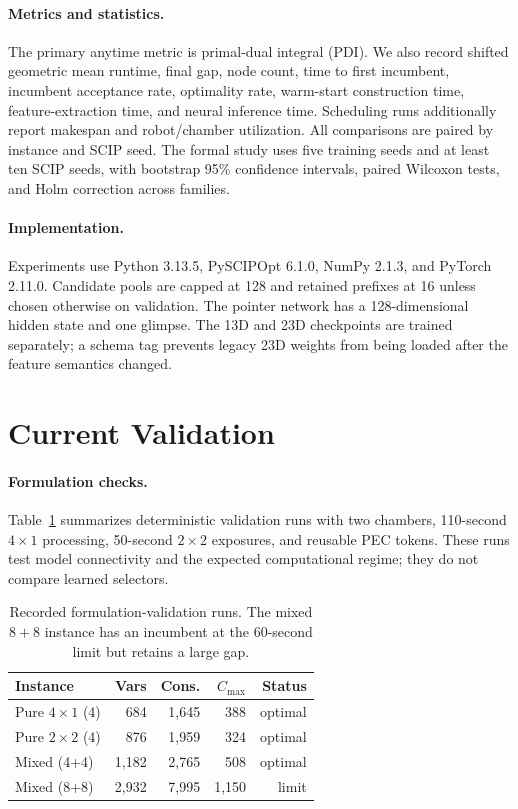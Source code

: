\documentclass[letterpaper]{article}
\begin{document}
\paragraph{Metrics and statistics.}
The primary anytime metric is primal-dual integral (PDI).
We also record shifted geometric mean runtime, final gap, node count, time to first incumbent, incumbent acceptance rate, optimality rate, warm-start construction time, feature-extraction time, and neural inference time.
Scheduling runs additionally report makespan and robot/chamber utilization.
All comparisons are paired by instance and SCIP seed.
The formal study uses five training seeds and at least ten SCIP seeds, with bootstrap 95\% confidence intervals, paired Wilcoxon tests, and Holm correction across families.

\paragraph{Implementation.}
Experiments use Python 3.13.5, PySCIPOpt 6.1.0, NumPy 2.1.3, and PyTorch 2.11.0.
Candidate pools are capped at 128 and retained prefixes at 16 unless chosen otherwise on validation.
The pointer network has a 128-dimensional hidden state and one glimpse.
The 13D and 23D checkpoints are trained separately; a schema tag prevents legacy 23D weights from being loaded after the feature semantics changed.

\section{Current Validation}

\paragraph{Formulation checks.}
Table~\ref{tab:preliminary} summarizes deterministic validation runs with two chambers, 110-second $4\times1$ processing, 50-second $2\times2$ exposures, and reusable PEC tokens.
These runs test model connectivity and the expected computational regime; they do not compare learned selectors.

\begin{table}[t]
\caption{Recorded formulation-validation runs. The mixed $8+8$ instance has an incumbent at the 60-second limit but retains a large gap.}
\label{tab:preliminary}
\centering
\small
\begin{tabular}{lrrrr}
\toprule
Instance & Vars & Cons. & $C_{\max}$ & Status \\
\midrule
Pure $4\times1$ (4) & 684 & 1,645 & 388 & optimal \\
Pure $2\times2$ (4) & 876 & 1,959 & 324 & optimal \\
Mixed (4+4) & 1,182 & 2,765 & 508 & optimal \\
Mixed (8+8) & 2,932 & 7,995 & 1,150 & limit \\
\bottomrule
\end{tabular}
\end{table}
\end{document}
